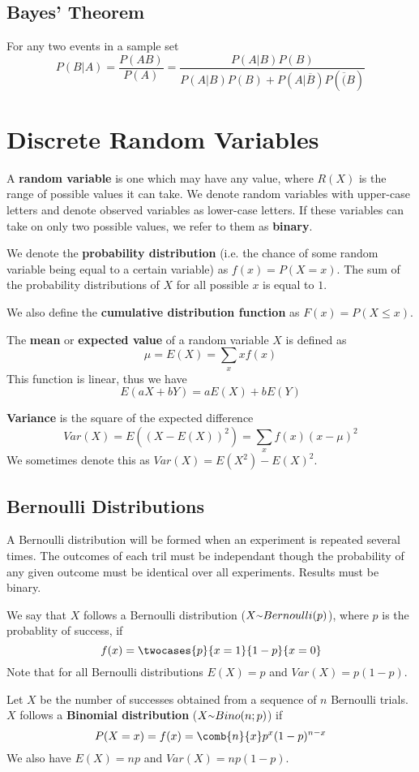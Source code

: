 \documentclass[12pt]{article}
\begin{document}
\subsection*{Bayes' Theorem}
For any two events in a sample set \[ P(B|A) = \frac{P(AB)}{P(A)} = \frac{P(A|B)P(B)}{P(A|B)P(B) + P(A|\overline{B})P(\overline(B)} \]

\section*{Discrete Random Variables}
A {\bf random variable} is one which may have any value, where $R(X)$ is the range of possible values it can take. We denote random variables with upper-case letters and denote observed variables as lower-case letters. If these variables can take on only two possible values, we refer to them as {\bf binary}.

We denote the {\bf probability distribution} (i.e. the chance of some random variable being equal to a certain variable) as $f(x) = P(X = x)$. The sum of the probability distributions of $X$ for all possible $x$ is equal to $1$.

We also define the {\bf cumulative distribution function} as $F(x) = P(X \leq x)$.

The {\bf mean} or {\bf expected value} of a random variable $X$ is defined as \[ \mu = E(X) = \sum_x xf(x) \] This function is linear, thus we have \[ E(aX + bY) = aE(X) + bE(Y) \]

{\bf Variance} is the square of the expected difference \[ Var(X) = E((X - E(X))^2) = \sum_x f(x)(x - \mu)^2 \] We sometimes denote this as $Var(X) = E(X^2) - E(X)^2$.

\subsection*{Bernoulli Distributions}
A Bernoulli distribution will be formed when an experiment is repeated several times. The outcomes of each tril must be independant though the probability of any given outcome must be identical over all experiments. Results must be binary.

We say that $X$ follows a Bernoulli distribution ($X \ttilde Bernoulli(p)$), where $p$ is the probablity of success, if \[ f(x) = \twocases{p}{x = 1}{1-p}{x = 0} \] Note that for all Bernoulli distributions $E(X) = p$ and $Var(X) = p(1-p)$.

Let $X$ be the number of successes obtained from a sequence of $n$ Bernoulli trials. $X$ follows a {\bf Binomial distribution} ($X \ttilde Bino(n; p)$) if \[ P(X = x) = f(x) = \comb{n}{x} p^x (1-p)^{n-x} \] We also have $E(X) = np$ and $Var(X) = np(1-p)$.
\end{document}
